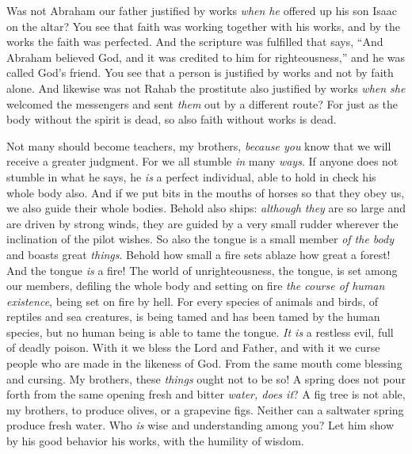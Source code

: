 \begin{biblechapter}
\verse Was not Abraham our father justified by works \textit{when he} offered up his son Isaac on the altar?
\verse You see that faith was working together with his works, and by the works the faith was perfected.
\verse And the scripture was fulfilled that says, “And Abraham believed God, and it was credited to him for righteousness,” and he was called God’s friend.
\verse You see that a person is justified by works and not by faith alone.
\verse And likewise was not Rahab the prostitute also justified by works \textit{when she} welcomed the messengers and sent \textit{them} out by a different route?
\verse For just as the body without the spirit is dead, so also faith without works is dead.
\end{biblechapter}

\begin{biblechapter} %
 Not many should become teachers, my brothers, \textit{because you} know that we will receive a greater judgment.
\verse For we all stumble \textit{in} many \textit{ways}. If anyone does not stumble in what he says, he \textit{is} a perfect individual, able to hold in check his whole body also.
\verse And if we put bits in the mouths of horses so that they obey us, we also guide their whole bodies.
\verse Behold also ships: \textit{although they} are so large and are driven by strong winds, they are guided by a very small rudder wherever the inclination of the pilot wishes.
\verse So also the tongue is a small member \textit{of the body} and boasts great \textit{things}. Behold how small a fire sets ablaze how great a forest!
\verse And the tongue \textit{is} a fire! The world of unrighteousness, the tongue, is set among our members, defiling the whole body and setting on fire \textit{the course of human existence}, being set on fire by hell.
\verse For every species of animals and birds, of reptiles and sea creatures, is being tamed and has been tamed by the human species,
\verse but no human being is able to tame the tongue. \textit{It is} a restless evil, full of deadly poison.
\verse With it we bless the Lord and Father, and with it we curse people who are made in the likeness of God.
\verse From the same mouth come blessing and cursing. My brothers, these \textit{things} ought not to be so!
\verse A spring does not pour forth from the same opening fresh and bitter \textit{water, does it}?
\verse A fig tree is not able, my brothers, to produce olives, or a grapevine figs. Neither can a saltwater spring produce fresh water.
 Who \textit{is} wise and understanding among you? Let him show by his good behavior his works, with the humility of wisdom.

\end{biblechapter}
